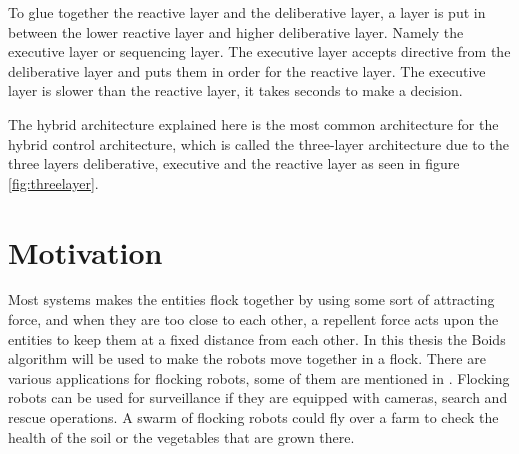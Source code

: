 To glue together the reactive layer and the deliberative layer, a layer is put in between the lower reactive layer and higher deliberative layer. Namely the executive layer or sequencing layer. The executive layer accepts directive from the deliberative layer and puts them in order for the reactive layer. The executive layer is slower than the reactive layer, it takes seconds to make a decision.

The hybrid architecture explained here is the most common architecture for the hybrid control architecture, which is called the three-layer architecture due to the three layers deliberative, executive and the reactive layer as seen in figure \ref{fig:threelayer}.





\section{Motivation}
\label{sec:motivation}
Most systems makes the entities flock together by using some sort of attracting force, and when they are too close to each other, a repellent force acts upon the entities to keep them at a fixed distance from each other.
In this thesis the Boids algorithm will be used to make the robots move together in a flock. 
There are various applications for flocking robots, some of them are mentioned in \citep{Csaba}. Flocking robots can be used for surveillance if they are equipped with cameras, search and rescue operations. A swarm of flocking robots could fly over a farm to check the health of the soil or the vegetables that are grown there. 



